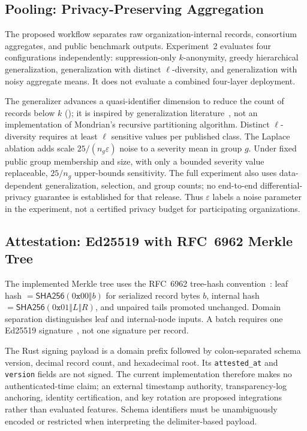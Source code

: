 \subsection{Pooling: Privacy-Preserving Aggregation}
\label{sec:privacy}

The proposed workflow separates raw organization-internal records, consortium aggregates, and public benchmark outputs. Experiment~2 evaluates four configurations independently: suppression-only $k$-anonymity, greedy hierarchical generalization, generalization with distinct $\ell$-diversity, and generalization with noisy aggregate means. It does not evaluate a combined four-layer deployment.

The generalizer advances a quasi-identifier dimension to reduce the count of records below $k$ (); it is inspired by generalization literature~\cite{lefevre_2006_mondrian}, not an implementation of Mondrian's recursive partitioning algorithm. Distinct $\ell$-diversity requires at least $\ell$ sensitive values per published class. The Laplace ablation adds scale $25/(n_g\varepsilon)$ noise to a severity mean in group $g$. Under fixed public group membership and size, with only a bounded severity value replaceable, $25/n_g$ upper-bounds sensitivity. The full experiment also uses data-dependent generalization, selection, and group counts; no end-to-end differential-privacy guarantee is established for that release. Thus $\varepsilon$ labels a noise parameter in the experiment, not a certified privacy budget for participating organizations.

\subsection{Attestation: Ed25519 with RFC~6962 Merkle Tree}
\label{sec:attestation}

The implemented Merkle tree uses the RFC~6962 tree-hash convention~\cite{laurie_2013_rfc6962}: leaf hash $=\mathsf{SHA256}(0\mathtt{x}00\Vert b)$ for serialized record bytes $b$, internal hash $=\mathsf{SHA256}(0\mathtt{x}01\Vert L\Vert R)$, and unpaired tails promoted unchanged. Domain separation distinguishes leaf and internal-node inputs. A batch requires one Ed25519 signature~\cite{bernstein_2012_ed25519}, not one signature per record.

The Rust signing payload is a domain prefix followed by colon-separated schema version, decimal record count, and hexadecimal root. Its \texttt{attested\_at} and \texttt{version} fields are not signed. The current implementation therefore makes no authenticated-time claim; an external timestamp authority, transparency-log anchoring, identity certification, and key rotation are proposed integrations rather than evaluated features. Schema identifiers must be unambiguously encoded or restricted when interpreting the delimiter-based payload.

